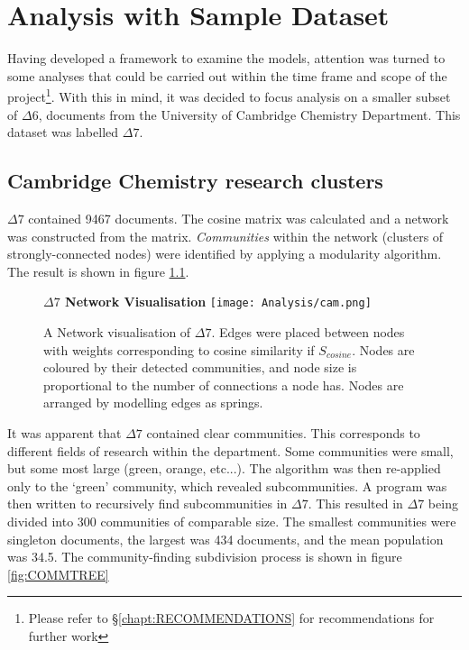 \chapter{Analysis with Sample Dataset}
\label{chapt:ANALYSIS}
Having developed a framework to examine the models, attention was turned to some analyses that could be carried out within the time frame and scope of the project\footnote{Please refer to  \S\ref{chapt:RECOMMENDATIONS} for recommendations for further work}. With this in mind, it was decided to focus analysis on a smaller subset of $\Delta6$, documents from the University of Cambridge Chemistry Department. This dataset was labelled $\Delta7$.
\section{Cambridge Chemistry research clusters}
\label{sec:RESEARCHCLUSTERS}
$\Delta7$ contained 9467 documents. The cosine matrix was calculated and a network was constructed from the matrix. \emph{Communities} within the network (clusters of strongly-connected nodes) were identified by applying a modularity algorithm\cite{modularity1}\cite{modularity2}. The result is shown in figure \ref{fig:CAMCOMMUNITIES}.
\begin{center}
\begin{figure}[H]
  \centering
  \textbf{$\Delta7$ Network Visualisation}
    \texttt{[image: Analysis/cam.png]}
    \caption[Network Visualisation of University of Cambridge Chemistry Department Documents]{A Network visualisation of  $\Delta7$. Edges were placed between nodes with weights corresponding to cosine similarity if $S_{cosine}$. Nodes are coloured by their detected communities, and node size is proportional to the number of connections a node has. Nodes are arranged by modelling edges as springs.}
    \label{fig:CAMCOMMUNITIES}

\end{figure} 
\end{center}
It was apparent that $\Delta7$ contained clear communities. This corresponds to different fields of research within the department. Some communities were small, but some most large (green, orange, etc...). The algorithm was then re-applied only to the `green' community, which revealed subcommunities. A program was then written to recursively find subcommunities in $\Delta7$. This resulted in $\Delta7$ being divided into 300 communities of comparable size. The smallest communities were singleton documents, the largest was 434 documents, and the mean population was 34.5. The community-finding subdivision process is shown in figure \ref{fig:COMMTREE}
